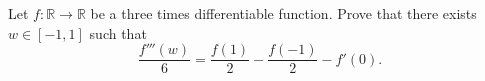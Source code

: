 Let $f: \mathbb{R} \rightarrow \mathbb{R}$ be a three times differentiable function. Prove that there exists $w \in [-1,1]$ such that \[ \frac{f'''(w)}{6} = \frac{f(1)}{2}-\frac{f(-1)}{2}-f'(0).  \]